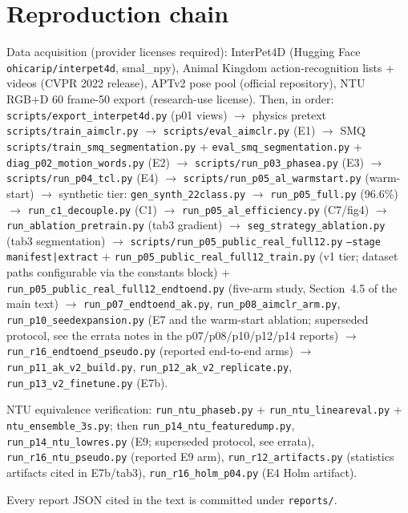 \documentclass[11pt,a4paper]{article}
\begin{document}
\section{Reproduction chain}\label{app:repro}

{\raggedright\sloppy
Data acquisition (provider licenses required): InterPet4D (Hugging Face \texttt{ohicarip/interpet4d}, smal\_npy), Animal Kingdom action-recognition lists + videos (CVPR 2022 release), APTv2 pose pool (official repository), NTU RGB+D 60 frame-50 export (research-use license). Then, in order: \texttt{scripts/export\_interpet4d.py} (p01 views) $\to$ physics pretext \texttt{scripts/train\_aimclr.py} $\to$ \texttt{scripts/eval\_aimclr.py} (E1) $\to$ SMQ \texttt{scripts/train\_smq\_segmentation.py} + \texttt{eval\_smq\_segmentation.py} + \texttt{diag\_p02\_motion\_words.py} (E2) $\to$ \texttt{scripts/run\_p03\_phasea.py} (E3) $\to$ \texttt{scripts/run\_p04\_tcl.py} (E4) $\to$ \texttt{scripts/run\_p05\_al\_warmstart.py} (warm-start) $\to$ synthetic tier: \texttt{gen\_synth\_22class.py} $\to$ \texttt{run\_p05\_full.py} (96.6\%) $\to$ \texttt{run\_c1\_decouple.py} (C1) $\to$ \texttt{run\_p05\_al\_efficiency.py} (C7/fig4) $\to$ \texttt{run\_ablation\_pretrain.py} (tab3 gradient) $\to$ \texttt{seg\_strategy\_ablation.py} (tab3 segmentation) $\to$ \texttt{scripts/run\_p05\_public\_real\_full12.py} \texttt{--stage manifest|extract} + \texttt{run\_p05\_public\_real\_full12\_train.py} (v1 tier; dataset paths configurable via the constants block) + \texttt{run\_p05\_public\_real\_full12\_endtoend.py} (five-arm study, Section~4.5 of the main text) $\to$ \texttt{run\_p07\_endtoend\_ak.py}, \texttt{run\_p08\_aimclr\_arm.py}, \texttt{run\_p10\_seedexpansion.py} (E7 and the warm-start ablation; superseded protocol, see the errata notes in the p07/p08/p10/p12/p14 reports) $\to$ \texttt{run\_r16\_endtoend\_pseudo.py} (reported end-to-end arms) $\to$ \texttt{run\_p11\_ak\_v2\_build.py}, \texttt{run\_p12\_ak\_v2\_replicate.py}, \texttt{run\_p13\_v2\_finetune.py} (E7b).

NTU equivalence verification: \texttt{run\_ntu\_phaseb.py} + \texttt{run\_ntu\_lineareval.py} + \texttt{ntu\_ensemble\_3s.py}; then \texttt{run\_p14\_ntu\_featuredump.py}, \texttt{run\_p14\_ntu\_lowres.py} (E9; superseded protocol, see errata), \texttt{run\_r16\_ntu\_pseudo.py} (reported E9 arm), \texttt{run\_r12\_artifacts.py} (statistics artifacts cited in E7b/tab3), \texttt{run\_r16\_holm\_p04.py} (E4 Holm artifact).

Every report JSON cited in the text is committed under \texttt{reports/}.\par}
\end{document}
